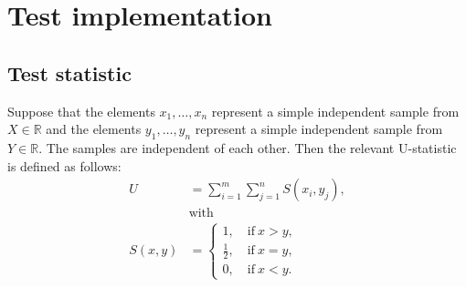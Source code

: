 \documentclass[]{scrreprt}
\begin{document}
\section{Test implementation}
\subsection{Test statistic}
Suppose that the elements $x_{1},\ldots,x_{n}$ represent a simple independent sample from~$X \in \mathbb{R}$ and the elements $y_{1},\ldots, y_{n}$ represent a simple independent sample from $Y \in \mathbb{R}$. The samples are independent of each other. Then the relevant U-statistic is defined as follows:
\begin{equation}\label{eq:U-statistic-base-formula}
\begin{aligned}
U&=\sum_{i=1}^{m} \sum_{j=1}^{n} S (x_{i},y_{j}),\\
&\text{with}\\
S(x,y)&=
\begin{cases}
1,\quad \text{if}\ x>y,\\
\frac{1}{2},\quad \text{if}\ x=y,\\
0,\quad \text{if}\ x<y.
\end{cases}
\end{aligned}
\end{equation}
%
\end{document}
